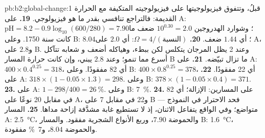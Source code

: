 \begin{solution}{pb:b2:global-change:1}
قبلُ، وتتفوق فيزيولوجيتها على فيزيولوجيته المتكيفة مع الحرارة القديمة:
فالتراجع تنافسي بقدر ما هو
فيزيولوجي.
\textbf{19.} على A: $\mathrm{pH} = 8.2 - 0.9\log_{10}(600/280) = 7.90$؛
وشوارد الهدروجين $10^{0.30} = 2.0$ ضعف ما كانت سنة 1750. وعلى B: $8.04$؛ أي $1.44$
ضعف.
\textbf{20.} $\Omega = 4/(\text{النسبة})$: أي $2.0$ على A، و$2.8$ على B. وعند 2
يظل المرجان يتكلس لكن ببطء، وهياكله أضعف و
شعابه تتآكل أسرع مما تنمو؛ وعند $2.8$ يبني، وإن كانت
حرارة المسار B ما تزال تبيّضه.
\textbf{21.} على A: $400\times 0.4^{0.25} = 318$، أي 82 مفقودًا. وعلى B:
$400\times 0.8^{0.25} = 378$، أي 22 مفقودًا.
\textbf{22.} على A: $318\times(1 - 0.05\times 1.3) = 298$. وعلى B:
$378\times(1 - 0.05\times 0.4) = 371$.
\textbf{23.} على A: $1 - 298/400 = \qty{26}{\%}$. وعلى B: \qty{7}{\%}.
\textbf{24.} على المسارين: الإزالة؛ أي 82 في مقابل 20 نوعًا على A، و22
في مقابل 7 على B --- فحد الاحترار في النموذج متواضع؛ وفي الواقع
يتفاعل الاثنان، إذ لا تستطيع غابة مشدَّفة إزاحة مداها.
\textbf{25.} المسار A: \qty{2.5}{\celsius}، والحموضة $7.90$، وربع
الأنواع الشجرية مفقود. والمسار B: \qty{1.6}{\celsius}، والحموضة $8.04$، و\qty{7}{\%}
مفقودة.
\end{solution}
